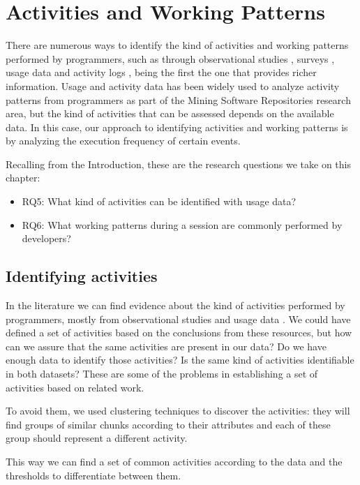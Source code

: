 \chapter{Activities and Working Patterns}
There are numerous ways to identify the kind of activities and working patterns performed by programmers, such as through observational studies \cite{GM04}, surveys \cite{PR11}, usage data \cite{MPB12} and activity logs \cite{CLQ15}, being the first the one that provides richer information. Usage and activity data has been widely used to analyze activity patterns from programmers as part of the Mining Software Repositories research area, but the kind of activities that can be assessed depends on the available data. In this case, our approach to identifying activities and working patterns is by analyzing the execution frequency of certain events.

Recalling from the Introduction, these are the research questions we take on this chapter:
\begin{itemize}
	\item RQ5: What kind of activities can be identified with usage data?
	\item RQ6: What working patterns during a session are commonly performed by developers?
\end{itemize}

\section{Identifying activities}
In the literature we can find evidence about the kind of activities performed by programmers, mostly from observational studies and usage data \cite{LVD06, GM04, MMLK14, MKF06}. We could have defined a set of activities based on the conclusions from these resources, but how can we assure that the same activities are present in our data? Do we have enough data to identify those activities? Is the same kind of activities identifiable in both datasets? These are some of the problems in establishing a set of activities based on related work. \begin{changedforreviewerlong}
To avoid them, we used clustering techniques to discover the activities: they will find groups of similar chunks according to their attributes and each of these group should represent a different activity. \end{changedforreviewerlong} This way we can find a set of common activities according to the data and the thresholds to differentiate between them.

